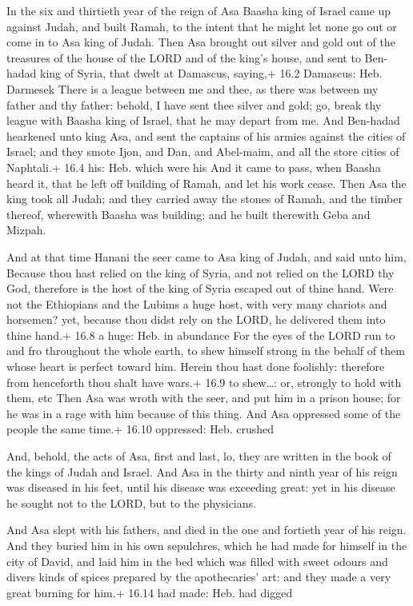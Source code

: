  In the six and thirtieth year of the reign of Asa Baasha
king of Israel came up against Judah, and built Ramah, to the intent
that he might let none go out or come in to Asa king of Judah.
 Then Asa brought out silver and gold out of the treasures
of the house of the LORD and of the king's house, and sent to Ben-hadad
king of Syria, that dwelt at Damascus, saying,+ 16.2 Damascus: Heb.
Darmesek  There is a league between me and thee, as there
was between my father and thy father: behold, I have sent thee silver
and gold; go, break thy league with Baasha king of Israel, that he may
depart from me.  And Ben-hadad hearkened unto king Asa, and
sent the captains of his armies against the cities of Israel; and they
smote Ijon, and Dan, and Abel-maim, and all the store cities of
Naphtali.+ 16.4 his: Heb. which were his  And it came to
pass, when Baasha heard it, that he left off building of Ramah, and let
his work cease.  Then Asa the king took all Judah; and they
carried away the stones of Ramah, and the timber thereof, wherewith
Baasha was building; and he built therewith Geba and Mizpah.

 And at that time Hanani the seer came to Asa king of
Judah, and said unto him, Because thou hast relied on the king of Syria,
and not relied on the LORD thy God, therefore is the host of the king of
Syria escaped out of thine hand.  Were not the Ethiopians
and the Lubims a huge host, with very many chariots and horsemen? yet,
because thou didst rely on the LORD, he delivered them into thine hand.+
16.8 a huge: Heb. in abundance  For the eyes of the LORD run
to and fro throughout the whole earth, to shew himself strong in the
behalf of them whose heart is perfect toward him. Herein thou hast done
foolishly: therefore from henceforth thou shalt have wars.+ 16.9 to
shew\ldots: or, strongly to hold with them, etc  Then Asa
was wroth with the seer, and put him in a prison house; for he was in a
rage with him because of this thing. And Asa oppressed some of the
people the same time.+ 16.10 oppressed: Heb. crushed

 And, behold, the acts of Asa, first and last, lo, they
are written in the book of the kings of Judah and Israel. 
And Asa in the thirty and ninth year of his reign was diseased in his
feet, until his disease was exceeding great: yet in his disease he
sought not to the LORD, but to the physicians.

 And Asa slept with his fathers, and died in the one and
fortieth year of his reign.  And they buried him in his own
sepulchres, which he had made for himself in the city of David, and laid
him in the bed which was filled with sweet odours and divers kinds of
spices prepared by the apothecaries' art: and they made a very great
burning for him.+ 16.14 had made: Heb. had digged

